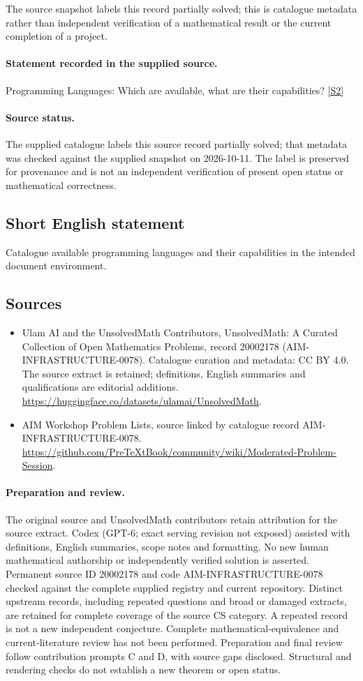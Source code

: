 \documentclass[11pt]{article}
\begin{document}
The source snapshot labels this record partially solved; this is catalogue metadata rather than independent verification of a mathematical result or the current completion of a project.
\paragraph{Statement recorded in the supplied source.}
Programming Languages: Which are available, what are their capabilities? \href{https://github.com/PreTeXtBook/community/wiki/Moderated-Problem-Session}{[S2]}
\paragraph{Source status.}
The supplied catalogue labels this source record partially solved; that metadata was checked against the supplied snapshot on 2026-10-11. The label is preserved for provenance and is not an independent verification of present open status or mathematical correctness.
\subsection{Short English statement}
Catalogue available programming languages and their capabilities in the intended document environment.
\subsection{Sources}
\begin{itemize}
\item[S1] Ulam AI and the UnsolvedMath Contributors, UnsolvedMath: A Curated Collection of Open Mathematics Problems, record 20002178 (AIM-INFRASTRUCTURE-0078). Catalogue curation and metadata: CC BY 4.0. The source extract is retained; definitions, English summaries and qualifications are editorial additions.
\url{https://huggingface.co/datasets/ulamai/UnsolvedMath}.
\item[S2] AIM Workshop Problem Lists, source linked by catalogue record AIM-INFRASTRUCTURE-0078.
\url{https://github.com/PreTeXtBook/community/wiki/Moderated-Problem-Session}.
\end{itemize}
\paragraph{Preparation and review.}
The original source and UnsolvedMath contributors retain attribution for the source extract. Codex (GPT-6; exact serving revision not exposed) assisted with definitions, English summaries, scope notes and formatting. No new human mathematical authorship or independently verified solution is asserted. Permanent source ID 20002178 and code AIM-INFRASTRUCTURE-0078 checked against the complete supplied registry and current repository. Distinct upstream records, including repeated questions and broad or damaged extracts, are retained for complete coverage of the source CS category. A repeated record is not a new independent conjecture. Complete mathematical-equivalence and current-literature review has not been performed. Preparation and final review follow contribution prompts C and D, with source gaps disclosed. Structural and rendering checks do not establish a new theorem or open status.
\label{end:20002178}
\end{document}
